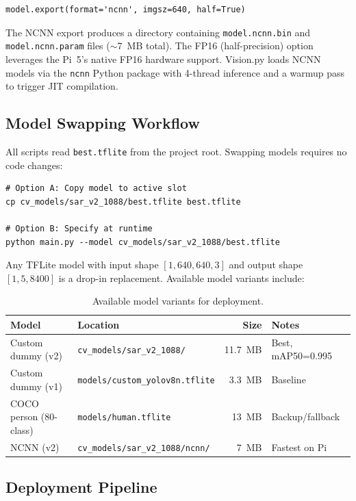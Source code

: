 \begin{verbatim}
model.export(format='ncnn', imgsz=640, half=True)
\end{verbatim}

\noindent The NCNN export produces a directory containing \texttt{model.ncnn.bin}
and \texttt{model.ncnn.param} files ($\sim$7~MB total). The FP16 (half-precision)
option leverages the Pi~5's native FP16 hardware support. Vision.py loads NCNN
models via the \texttt{ncnn} Python package with 4-thread inference and a warmup
pass to trigger JIT compilation.

\subsection{Model Swapping Workflow}

All scripts read \texttt{best.tflite} from the project root. Swapping models
requires no code changes:

\begin{verbatim}
# Option A: Copy model to active slot
cp cv_models/sar_v2_1088/best.tflite best.tflite

# Option B: Specify at runtime
python main.py --model cv_models/sar_v2_1088/best.tflite
\end{verbatim}

Any TFLite model with input shape $[1, 640, 640, 3]$ and output shape
$[1, 5, 8400]$ is a drop-in replacement. Available model variants include:

\begin{table}[htbp]
\centering
\caption{Available model variants for deployment.}
\label{tab:model-variants}
\begin{tabular}{llrl}
\hline
\textbf{Model} & \textbf{Location} & \textbf{Size} & \textbf{Notes} \\
\hline
Custom dummy (v2) & \texttt{cv\_models/sar\_v2\_1088/} & 11.7~MB & Best, mAP50=0.995 \\
Custom dummy (v1) & \texttt{models/custom\_yolov8n.tflite} & 3.3~MB & Baseline \\
COCO person (80-class) & \texttt{models/human.tflite} & 13~MB & Backup/fallback \\
NCNN (v2)         & \texttt{cv\_models/sar\_v2\_1088/ncnn/} & 7~MB & Fastest on Pi \\
\hline
\end{tabular}
\end{table}

\subsection{Deployment Pipeline}


